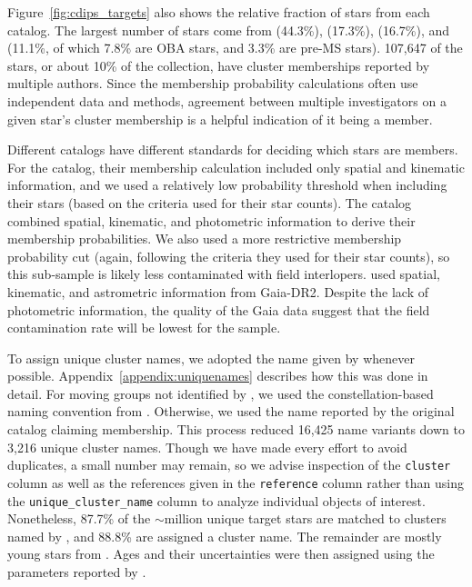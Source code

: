 \documentclass[12pt,twocolumn,tighten]{aastex62}
\begin{document}
Figure~\ref{fig:cdips_targets} also shows the relative fraction of
stars from each catalog.  The largest number of stars come from
\citealt{dias_proper_2014} (44.3\%), \citealt{Kharchenko_et_al_2013}
(17.3\%), \citealt{cantat-gaudin_gaia_2018} (16.7\%), and
\citealt{zari_3d_2018} (11.1\%, of which 7.8\% are OBA stars, and
3.3\% are pre-MS stars).  107{,}647 of the stars, or about 10\% of the
collection, have cluster memberships reported by multiple authors.
Since the membership probability calculations often use independent
data and methods, agreement between multiple investigators on a given
star's cluster membership is a helpful indication of it being a
member.

Different catalogs have different standards for deciding which stars
are members.  For the \citet{dias_proper_2014} catalog, their
membership calculation included only spatial and kinematic
information, and we used a relatively low probability threshold when
including their stars (based on the criteria
\citealt{dias_proper_2014} used for their star counts).  The
\citet{Kharchenko_et_al_2013} catalog combined spatial, kinematic, and
photometric information to derive their membership probabilities.  We
also used a more restrictive membership probability cut (again,
following the criteria they used for their star counts), so this
sub-sample is likely less contaminated with field interlopers.
\citet{cantat-gaudin_gaia_2018} used spatial, kinematic, and
astrometric information from Gaia-DR2. Despite the lack of photometric
information, the quality of the Gaia data suggest that the field
contamination rate will be lowest for the
\citet{cantat-gaudin_gaia_2018} sample.

To assign unique cluster names, we adopted the name given by
\citet{Kharchenko_et_al_2013} whenever possible.
Appendix~\ref{appendix:uniquenames} describes  how this was done in
detail.  For moving groups not identified by
\citet{Kharchenko_et_al_2013}, we used the constellation-based naming
convention from \citet{gagne_banyan_XI_2018}.  Otherwise, we used the
name reported by the original catalog claiming membership.  This
process reduced 16,425 name variants down to 3,216 unique cluster
names.  Though we have made every effort to avoid duplicates, a small
number may remain, so we advise inspection of the \texttt{cluster}
column as well as the references given in the \texttt{reference}
column rather than using the \texttt{unique\_cluster\_name} column to
analyze individual objects of interest.  Nonetheless, 87.7\% of the
$\sim$million unique target stars are matched to clusters named by
\citet{Kharchenko_et_al_2013}, and 88.8\% are assigned a cluster name.
The remainder are mostly young stars from \citet{zari_3d_2018}.
Ages and their uncertainties were then assigned using the parameters
reported by \citet{Kharchenko_et_al_2013}.
\end{document}
